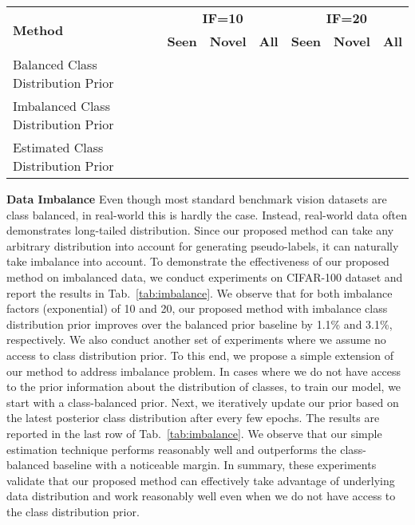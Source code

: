 \documentclass[runningheads]{eccv2022submission}
\begin{document}
\begin{table*}[t]
\caption{Performance on \textbf{CIFAR-100} dataset with different imabalance factors (\textbf{IF}) with 50\% classes as seen and 50\% classes as novel.}
\begin{center}
\small
\begin{tabular}{lccc|ccc}
\hline



\multicolumn{1}{l}{\multirow{2}{*}{\textbf{Method}}} &
 \multicolumn{3}{c|}{\textbf{IF=10}} & \multicolumn{3}{c}{\textbf{IF=20}}\\  
\multicolumn{1}{c}{} & \textbf{Seen} & \textbf{Novel} & \textbf{All} & \textbf{Seen} & \textbf{Novel} & \textbf{All}\\




\hline
Balanced Class Distribution Prior &  &  &  &  &  & \\
Imbalanced Class Distribution Prior &  &  &  &  &  & \\
Estimated Class Distribution Prior &  &  &  &  &  & \\
\hline 



\end{tabular}
\end{center}
\vspace{-4mm}
\label{tab:imbalance}
\vspace{-3mm}
\end{table*}
\vspace{1mm}
\label{par:data_imbalance}
\noindent \textbf{Data Imbalance} Even though most standard benchmark vision datasets are class balanced, in real-world this is hardly the case. Instead, real-world data often demonstrates long-tailed distribution. Since our proposed method can take any arbitrary distribution into account for generating pseudo-labels, it can naturally take imbalance into account. To demonstrate the effectiveness of our proposed method on imbalanced data, we conduct experiments on CIFAR-100 dataset and report the results in Tab.~\ref{tab:imbalance}. We observe that for both imbalance factors (exponential) of 10 and 20, our proposed method with imbalance class distribution prior improves over the balanced prior baseline by 1.1\% and 3.1\%, respectively. We also conduct another set of experiments where we assume no access to class distribution prior. 
To this end, we propose a simple extension of our method to address imbalance problem. In cases where we do not have access to the prior information about the distribution of classes, to train our model, we start with a class-balanced prior. Next, we iteratively update our prior based on the latest posterior class distribution after every few epochs. The results are reported in the last row of Tab.~\ref{tab:imbalance}. We observe that our simple estimation technique performs reasonably well and outperforms the class-balanced baseline with a noticeable margin. In summary, these experiments validate that our proposed method can effectively take advantage of underlying data distribution and work reasonably well even when we do not have access to the class distribution prior.      
\end{document}
